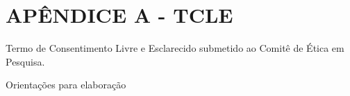 \section*{APÊNDICE A - TCLE}
Termo de Consentimento Livre e Esclarecido submetido ao Comitê de Ética em Pesquisa.

{\color{red} Orientações para elaboração}
\newpage